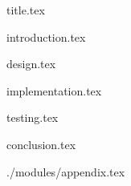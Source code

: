 \documentclass[a4paper,12pt]{article}
\begin{document}
{title.tex}

\newpage



\newpage
\vfill
\tableofcontents
\vfill
\newpage
\listoffigures

\newpage
{}



{introduction.tex}


{design.tex}

{implementation.tex}

{testing.tex}

{conclusion.tex}

 {./modules/}{appendix.tex}
\end{document}

